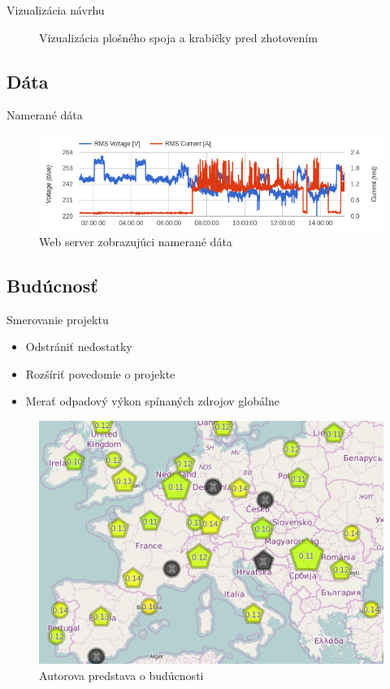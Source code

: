 \documentclass[hyperref={unicode}]{beamer}
\begin{document}
\begin{frame}{Vizualizácia návrhu}
\begin{figure}[htp]
		\caption{Vizualizácia plošného spoja a krabičky pred zhotovením}
	\end{figure}
\end{frame}



\subsection{Dáta}
\label{sub:Dáta}

\begin{frame}{Namerané dáta}
	\begin{figure}[htp]
		\centering
		\includegraphics[width=1\linewidth]{plot-preview}
		\caption{Web server zobrazujúci namerané dáta}
	\end{figure}
\end{frame}



\subsection{Budúcnosť}
\label{sub:Budúcnosť}

\begin{frame}{Smerovanie projektu}
	\begin{itemize}
		\item Odstrániť nedostatky
		\item Rozšíriť povedomie o projekte
		\item Merať odpadový výkon spínaných zdrojov globálne
	\end{itemize}

	\begin{figure}[htp]
		\centering
		\includegraphics[width=.6\linewidth]{map}
		\caption{Autorova predstava o budúcnosti}
	\end{figure}
\end{frame}
\end{document}
